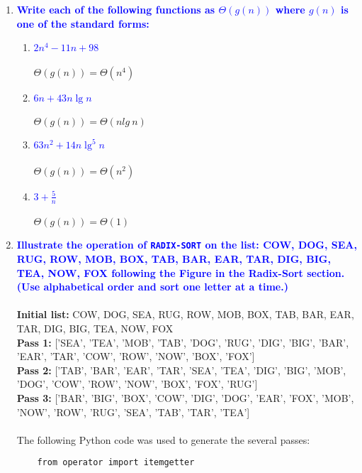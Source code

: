 \documentclass{article}
\begin{document}
\begin{enumerate}
\item \textbf{\textcolor{blue}{Write each of the following functions as $\Theta(g(n))$ where
$g(n)$ is one of the standard forms:}}
    \begin{enumerate}
    \item \textbf{\textcolor{blue}{$2n^4-11n+98$}}
        \\\\ $\Theta(g(n)) = \Theta(n^4)$ \\
    \item \textbf{\textcolor{blue}{$6n + 43n\lg n$}}
        \\\\ $\Theta(g(n)) = \Theta(nlg\ n)$ \\
    \item \textbf{\textcolor{blue}{$63n^2 + 14n\lg^5n$}}
        \\\\ $\Theta(g(n)) = \Theta(n^2)$ \\
    \item \textbf{\textcolor{blue}{$3 + \frac{5}{n}$}}
        \\\\ $\Theta(g(n)) = \Theta(1)$ \\
    \end{enumerate}

\item \textbf{\textcolor{blue}{Illustrate the operation of {\tt RADIX-SORT} on the
list: COW, DOG, SEA, RUG, ROW, MOB, BOX, TAB, BAR, EAR, TAR, DIG, BIG,
TEA, NOW, FOX following the Figure in the Radix-Sort section.
(Use alphabetical order and sort one letter at a time.)}}
    \\\\ \textbf{Initial list:} COW, DOG, SEA, RUG, ROW, MOB, BOX, TAB, BAR, EAR, TAR, DIG, BIG, TEA, NOW, FOX
    \\ \textbf{Pass 1:} ['SEA', 'TEA', 'MOB', 'TAB', 'DOG', 'RUG', 'DIG', 'BIG', 'BAR', 'EAR', 'TAR', 'COW', 'ROW', 'NOW', 'BOX', 'FOX']
    \\ \textbf{Pass 2:} ['TAB', 'BAR', 'EAR', 'TAR', 'SEA', 'TEA', 'DIG', 'BIG', 'MOB', 'DOG', 'COW', 'ROW', 'NOW', 'BOX', 'FOX', 'RUG']
    \\ \textbf{Pass 3:} ['BAR', 'BIG', 'BOX', 'COW', 'DIG', 'DOG', 'EAR', 'FOX', 'MOB', 'NOW', 'ROW', 'RUG', 'SEA', 'TAB', 'TAR', 'TEA']
    \\\\ The following Python code was used to generate the several passes:
    \begin{verbatim}
    from operator import itemgetter
                 

\end{verbatim}
\end{enumerate}
\end{document}

